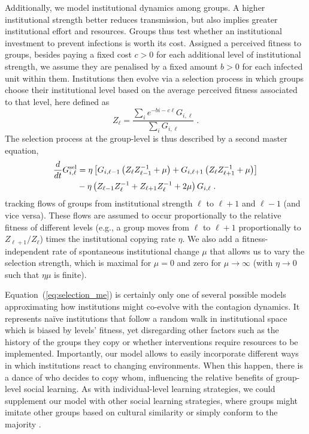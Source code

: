 Additionally, we model institutional dynamics among groups. A higher institutional strength better reduces transmission, but also implies greater institutional effort and resources. Groups thus test whether an institutional investment to prevent infections is worth its cost. Assigned a perceived fitness to groups, besides paying a fixed cost $c > 0$ for each additional level of institutional strength, we assume they are penalised by a fixed amount $b > 0$ for each infected unit within them. Institutions then evolve via a selection process in which groups choose their institutional level based on the average perceived fitness associated to that level, here defined as
\begin{equation}
\label{eq:Z}
Z_\ell = \dfrac{\sum_{i} e^{- bi - c\ell} G_{i,\ell}}{\sum_{i} G_{i,\ell}} \; .
\end{equation}
The selection process at the group-level is thus described by a second master equation,
\begin{align}
    \label{eq:selection_me}
        \frac{d}{dt}G_{i,\ell}^{\textrm{sel}} &= \eta \left[G_{i,\ell-1}\left(Z_\ell Z_{\ell-1}^{-1} + \mu\right) + G_{i,\ell+1}\left(Z_\ell Z_{\ell+1}^{-1}+\mu\right) \right] \notag \\
         &- \eta \left(Z_{\ell - 1}Z_{\ell}^{-1}+Z_{\ell+1}Z_{\ell}^{-1} + 2\mu\right)G_{i,\ell}\; . 
\end{align}
tracking flows of groups from institutional strength $\ell$ to $\ell+1$ and $\ell-1$ (and vice versa). These flows are assumed to occur proportionally to the relative fitness of different levels (e.g., a group moves from $\ell$ to $\ell +1 $ proportionally to $Z_{\ell+1} / Z_{\ell}$) times the institutional copying rate $\eta$. We also add a fitness-independent rate of spontaneous institutional change $\mu$ that allows us to vary the selection strength, which is maximal for $\mu = 0$ and zero for $\mu\rightarrow\infty$ (with $\eta\rightarrow 0$ such that $\eta\mu$ is finite).


Equation~(\ref{eq:selection_me}) is certainly only one of several possible models approximating how institutions might co-evolve with the contagion dynamics. It represents na\"{i}ve institutions that follow a random walk in institutional space which is biased by levels' fitness, yet disregarding other factors such as the history of the groups they copy or whether interventions require resources to be implemented. Importantly, our model allows to easily incorporate different ways in which institutions react to changing environments. When this happen, there is a dance of who decides to copy whom, influencing the relative benefits of group-level social learning. As with individual-level learning strategies, we could supplement our model with other social learning strategies, where groups might imitate other groups based on cultural similarity or simply conform to the majority \cite{boyd_culture_1988}. 

